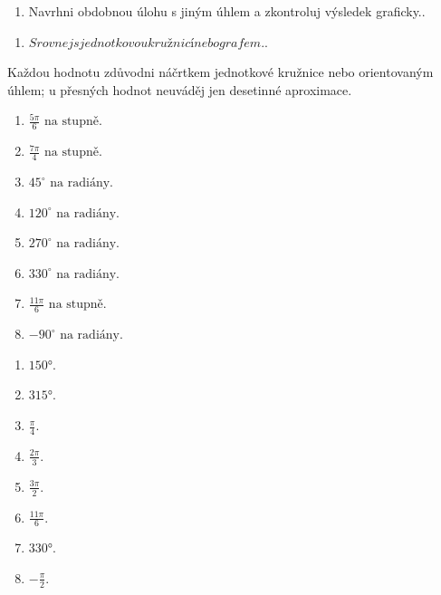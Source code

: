 \documentclass[11pt,a4paper]{article}
\begin{document}
\begin{zadaniReseniBox}[title={Rozšíření 1}]
\begin{enumerate}[label=\alph*)]
\item Navrhni obdobnou úlohu s jiným úhlem a zkontroluj výsledek graficky..
\end{enumerate}
\tcblower
\begin{enumerate}[label=\alph*)]
\item $Srovnej s jednotkovou kružnicí nebo grafem.$.
\end{enumerate}
\end{zadaniReseniBox}
Každou hodnotu zdůvodni náčrtkem jednotkové kružnice nebo orientovaným úhlem; u přesných hodnot neuváděj jen desetinné aproximace.
\begin{zadaniReseniBox}[title={Domácí úkol}]
\begin{enumerate}[label=\alph*)]
\item $\frac{5\pi}{6}\text{ na stupně}$.
\item $\frac{7\pi}{4}\text{ na stupně}$.
\item $45^\circ\text{ na radiány}$.
\item $120^\circ\text{ na radiány}$.
\item $270^\circ\text{ na radiány}$.
\item $330^\circ\text{ na radiány}$.
\item $\frac{11\pi}{6}\text{ na stupně}$.
\item $-90^\circ\text{ na radiány}$.
\end{enumerate}
\tcblower
\begin{enumerate}[label=\alph*)]
\item $150°$.
\item $315°$.
\item $\frac{\pi}{4}$.
\item $\frac{2\pi}{3}$.
\item $\frac{3\pi}{2}$.
\item $\frac{11\pi}{6}$.
\item $330°$.
\item $-\frac{\pi}{2}$.
\end{enumerate}
\end{zadaniReseniBox}
\end{document}
